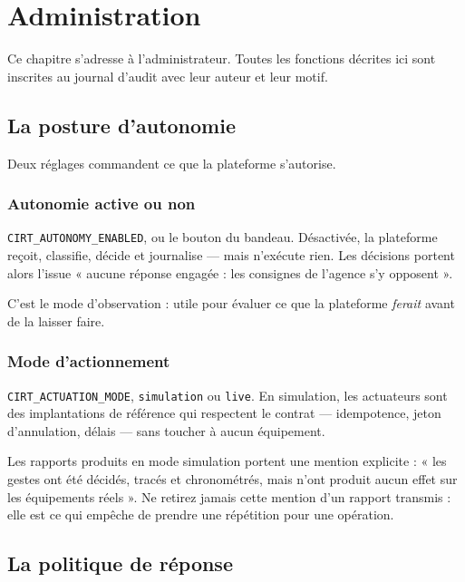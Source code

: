 \chapter{Administration}
\minitoc

Ce chapitre s'adresse à l'administrateur. Toutes les fonctions décrites ici
sont inscrites au journal d'audit avec leur auteur et leur motif.

\section{La posture d'autonomie}

Deux réglages commandent ce que la plateforme s'autorise.

\subsection{Autonomie active ou non}

\texttt{CIRT\_AUTONOMY\_ENABLED}, ou le bouton du bandeau. Désactivée, la
plateforme reçoit, classifie, décide et journalise — mais n'exécute rien. Les
décisions portent alors l'issue « aucune réponse engagée : les consignes de
l'agence s'y opposent ».

C'est le mode d'observation : utile pour évaluer ce que la plateforme
\emph{ferait} avant de la laisser faire.

\subsection{Mode d'actionnement}

\texttt{CIRT\_ACTUATION\_MODE}, \texttt{simulation} ou \texttt{live}. En
simulation, les actuateurs sont des implantations de référence qui respectent
le contrat — idempotence, jeton d'annulation, délais — sans toucher à aucun
équipement.

\begin{tcolorbox}[colback=orange!5!white, colframe=orange!70!black,
  title=\textbf{Attention}, fonttitle=\bfseries, boxrule=0.6pt]
Les rapports produits en mode simulation portent une mention explicite : « les
gestes ont été décidés, tracés et chronométrés, mais n'ont produit aucun effet
sur les équipements réels ». Ne retirez jamais cette mention d'un rapport
transmis : elle est ce qui empêche de prendre une répétition pour une opération.
\end{tcolorbox}

\section{La politique de réponse}

